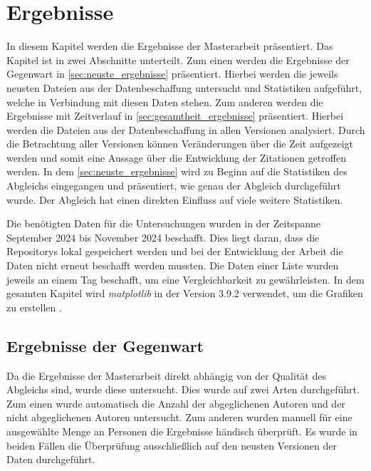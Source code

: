 \chapter{Ergebnisse}
\label{chap:ergebnisse}
In diesem Kapitel werden die Ergebnisse der Masterarbeit präsentiert.
Das Kapitel ist in zwei Abschnitte unterteilt.
Zum einen werden die Ergebnisse der Gegenwart in \autoref{sec:neuste_ergebnisse} präsentiert.
Hierbei werden die jeweils neusten Dateien aus der Datenbeschaffung untersucht und Statistiken aufgeführt, welche in Verbindung mit diesen Daten stehen.
Zum anderen werden die Ergebnisse mit Zeitverlauf in \autoref{sec:gesamtheit_ergebnisse} präsentiert.
Hierbei werden die Dateien aus der Datenbeschaffung in allen Versionen analysiert.
Durch die Betrachtung aller Versionen können Veränderungen über die Zeit aufgezeigt werden und somit eine Aussage über die Entwicklung der Zitationen getroffen werden.
In dem \autoref{sec:neuste_ergebnisse} wird zu Beginn auf die Statistiken des Abgleichs eingegangen und präsentiert, wie genau der Abgleich durchgeführt wurde.
Der Abgleich hat einen direkten Einfluss auf viele weitere Statistiken.

Die benötigten Daten für die Untersuchungen wurden in der Zeitspanne September 2024 bis November 2024 beschafft.
Dies liegt daran, dass die Repositorys lokal gespeichert werden und bei der Entwicklung der Arbeit die Daten nicht erneut beschafft werden mussten.
Die Daten einer Liste wurden jeweils an einem Tag beschafft, um eine Vergleichbarkeit zu gewährleisten.
In dem gesamten Kapitel wird \emph{matplotlib} in der Version 3.9.2 verwendet, um die Grafiken zu erstellen \autocite{hunter_matplotlib_2007}.

\section{Ergebnisse der Gegenwart}
\label{sec:neuste_ergebnisse}
Da die Ergebnisse der Masterarbeit direkt abhängig von der Qualität des Abgleichs sind, wurde diese untersucht.
Dies wurde auf zwei Arten durchgeführt.
Zum einen wurde automatisch die Anzahl der abgeglichenen Autoren und der nicht abgeglichenen Autoren untersucht.
Zum anderen wurden manuell für eine ausgewählte Menge an Personen die Ergebnisse händisch überprüft.
Es wurde in beiden Fällen die Überprüfung ausschließlich auf den neusten Versionen der Daten durchgeführt.

